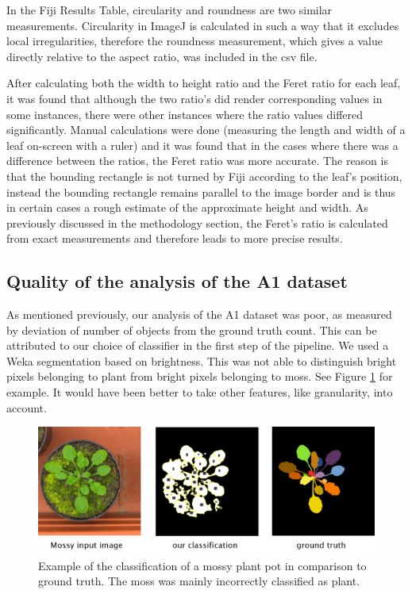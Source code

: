 \documentclass[paper=A4,bibliography=totocnumbered]{scrartcl}
\begin{document}
In  the Fiji Results Table, circularity and roundness are two similar measurements. Circularity in ImageJ is calculated in such a way that it excludes local irregularities, therefore the roundness measurement, which gives a value directly relative to the aspect ratio, was included in the csv file. 

After calculating both the width to height ratio and the Feret ratio for each leaf, it was found that although the two ratio's did render corresponding values in some instances, there were other instances where the ratio values differed significantly. Manual calculations were done (measuring the length and width of a leaf on-screen with a ruler) and it was found that in the cases where there was a difference between the ratios, the Feret ratio was more accurate. The reason is that the bounding rectangle is not turned by Fiji according to the leaf's position, instead the bounding rectangle remains parallel to the image border and is thus in certain cases a rough estimate of the approximate height and width. As previously discussed in the methodology section, the Feret's ratio is calculated from exact measurements and therefore leads to more precise results. 

\subsection{Quality of the analysis of the A1 dataset}

As mentioned previously, our analysis of the A1 dataset was poor, as measured by deviation of number of objects from the ground truth count. This can be attributed to our choice of classifier in the first step of the pipeline. We used a Weka segmentation based on brightness. This was not able to distinguish bright pixels belonging to plant from bright pixels belonging to moss. See Figure \ref{fig:moss} for example. It would have been better to take other features, like granularity, into account. 


\begin{figure}
	\centering
	\includegraphics[width=13cm]{pic/moss}
	\caption{Example of the classification of a mossy plant pot in comparison to ground truth. The moss was mainly incorrectly classified as plant.}
	\label{fig:moss}
\end{figure}
\end{document}

